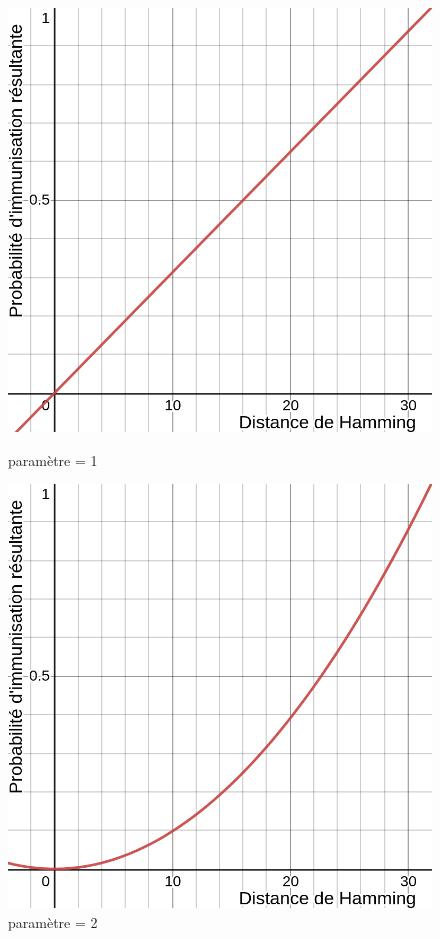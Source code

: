 \begin{figure}[h]
  \centering
    \captionsetup{justification=centering}
  \begin{minipage}[b]{0.4\textwidth}
    \includegraphics[width=\textwidth]{Images/fonction_1.png}
    \caption{paramètre = 1}
  \end{minipage}
  \hfill
  \begin{minipage}[b]{0.4\textwidth}
    \includegraphics[width=\textwidth]{Images/fonction_2.png}
    \caption{paramètre = 2}
  \end{minipage}
\end{figure}

